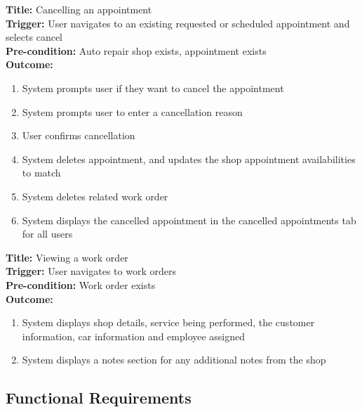 \documentclass[12pt]{article}
\begin{document}
\textbf{Title:} Cancelling an appointment\\
\textbf{Trigger:} User navigates to an existing requested or scheduled appointment and selects cancel\\
\textbf{Pre-condition:} Auto repair shop exists, appointment exists\\
\textbf{Outcome:}
\begin{enumerate}
	\item System prompts user if they want to cancel the appointment
	\item System prompts user to enter a cancellation reason
	\item User confirms cancellation
	\item System deletes appointment, and updates the shop appointment availabilities to match
	\item System deletes related work order
	\item System displays the cancelled appointment in the cancelled appointments tab for all users
\end{enumerate}

\textbf{Title:} Viewing a work order\\
\textbf{Trigger:} User navigates to work orders\\
\textbf{Pre-condition:} Work order exists\\
\textbf{Outcome:}
\begin{enumerate}
	\item System displays shop details, service being performed, the customer information, car information
	      and employee assigned
	\item System displays a notes section for any additional notes from the shop
\end{enumerate}

\subsection{Functional Requirements}
\end{document}
